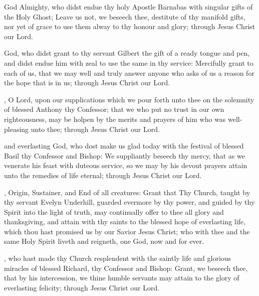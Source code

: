  God Almighty, who didst endue thy holy Apostle Barnabas with singular gifts of the Holy Ghost; Leave us not, we beseech thee, destitute of thy manifold gifts, nor yet of grace to use them alway to thy honour and glory; through Jesus Christ our Lord.

 God, who didst grant to thy servant Gilbert the gift of a ready tongue and pen, and didst endue him with zeal to use the same in thy service: Mercifully grant to each of us, that we may well and truly answer anyone who asks of us a reason for the hope that is in us; through Jesus Christ our Lord.

, O Lord, upon our supplications which we pour forth unto thee on the solemnity of blessed Anthony thy Confessor; that we who put no trust in our own righteousness, may be holpen by the merits and prayers of him who was well-pleasing unto thee; through Jesus Christ our Lord.

 and everlasting God, who dost make us glad today with the festival of blessed Basil thy Confessor and Bishop: We suppliantly beseech thy mercy, that as we venerate his feast with duteous service, so we may by his devout prayers attain unto the remedies of life eternal; through Jesus Christ our Lord.

, Origin, Sustainer, and End of all creatures: Grant that Thy Church, taught by thy servant Evelyn Underhill, guarded evermore by thy power, and guided by thy Spirit into the light of truth, may continually offer to thee all glory and thanksgiving, and attain with thy saints to the blessed hope of everlasting life, which thou hast promised us by our Savior Jesus Christ; who with thee and the same Holy Spirit liveth and reigneth, one God, now and for ever.

, who hast made thy Church resplendent with the saintly life and glorious miracles of blessed Richard, thy Confessor and Bishop: Grant, we beseech thee, that by his intercession, we thine humble servants may attain to the glory of everlasting felicity; through Jesus Christ our Lord.


